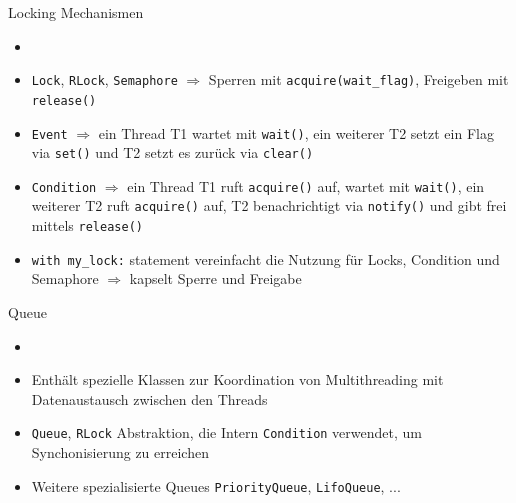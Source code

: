 \begin{frame}{Locking Mechanismen}
     \begin{itemize}
        \setlength{\itemindent}{2.5in}
        \item [\textbf{Locking Mechanismen aus threading Modul}]
    \end{itemize}
    \begin{itemize}
        \item \texttt{Lock}, \texttt{RLock}, \texttt{Semaphore} $\Rightarrow$  Sperren mit  \texttt{acquire(wait\_flag)}, Freigeben mit  \texttt{release()}
        \item \texttt{Event} $\Rightarrow$ ein Thread T1 wartet mit \texttt{wait()}, ein weiterer T2 setzt ein Flag via \texttt{set()}  und  T2 setzt es zurück via \texttt{clear()}
        \item \texttt{Condition} $\Rightarrow$ ein Thread T1 ruft  \texttt{acquire()} auf, wartet mit \texttt{wait()}, ein weiterer T2 ruft  \texttt{acquire()} auf,  T2 benachrichtigt via \texttt{notify()} und gibt frei mittels \texttt{release()}
        \item \texttt{with my\_lock:} statement vereinfacht die Nutzung für Locks, Condition und Semaphore $\Rightarrow$ kapselt Sperre und Freigabe
       \end{itemize}

\end{frame}


\begin{frame}{Queue}
  \begin{itemize}
        \setlength{\itemindent}{1.0in}
        \item [\textbf{Das queue Modul}]
    \end{itemize}
    \begin{itemize}
        \item Enthält spezielle Klassen zur Koordination von Multithreading mit Datenaustausch zwischen den Threads
        \item \texttt{Queue}, \texttt{RLock} Abstraktion, die Intern \texttt{Condition} verwendet, um Synchonisierung zu erreichen
        \item Weitere spezialisierte Queues  \texttt{PriorityQueue}, \texttt{LifoQueue}, ...
    \end{itemize}

\end{frame}

